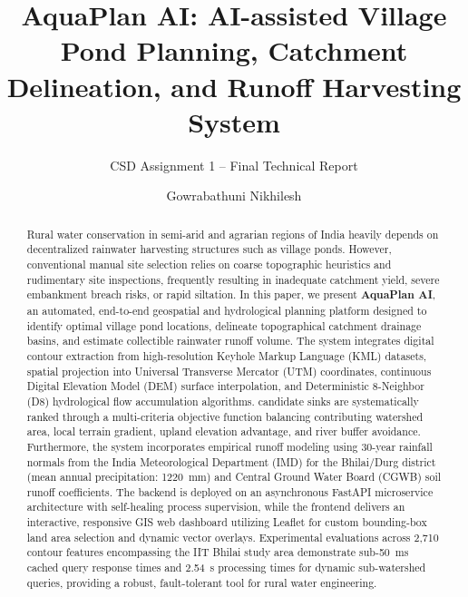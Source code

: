 \documentclass[manuscript,screen,review]{acmart}
\begin{document}
\title{AquaPlan AI: AI-assisted Village Pond Planning, Catchment Delineation, and Runoff Harvesting System}
\subtitle{CSD Assignment 1 -- Final Technical Report}

\author{Gowrabathuni Nikhilesh}

\renewcommand{\shortauthors}{G. Nikhilesh}

\begin{abstract}
Rural water conservation in semi-arid and agrarian regions of India heavily depends on decentralized rainwater harvesting structures such as village ponds. However, conventional manual site selection relies on coarse topographic heuristics and rudimentary site inspections, frequently resulting in inadequate catchment yield, severe embankment breach risks, or rapid siltation. In this paper, we present \textbf{AquaPlan AI}, an automated, end-to-end geospatial and hydrological planning platform designed to identify optimal village pond locations, delineate topographical catchment drainage basins, and estimate collectible rainwater runoff volume. The system integrates digital contour extraction from high-resolution Keyhole Markup Language (KML) datasets, spatial projection into Universal Transverse Mercator (UTM) coordinates, continuous Digital Elevation Model (DEM) surface interpolation, and Deterministic 8-Neighbor (D8) hydrological flow accumulation algorithms. candidate sinks are systematically ranked through a multi-criteria objective function balancing contributing watershed area, local terrain gradient, upland elevation advantage, and river buffer avoidance. Furthermore, the system incorporates empirical runoff modeling using 30-year rainfall normals from the India Meteorological Department (IMD) for the Bhilai/Durg district (mean annual precipitation: 1220~mm) and Central Ground Water Board (CGWB) soil runoff coefficients. The backend is deployed on an asynchronous FastAPI microservice architecture with self-healing process supervision, while the frontend delivers an interactive, responsive GIS web dashboard utilizing Leaflet for custom bounding-box land area selection and dynamic vector overlays. Experimental evaluations across 2,710 contour features encompassing the IIT Bhilai study area demonstrate sub-50~ms cached query response times and 2.54~s processing times for dynamic sub-watershed queries, providing a robust, fault-tolerant tool for rural water engineering.
\end{abstract}
\end{document}
